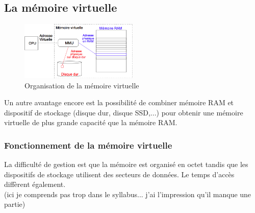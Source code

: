 \subsection{La mémoire virtuelle}
\begin{figure}
  \vspace{-0.5cm}
  \includegraphics[width=0.5\textwidth]{memvirt}
  \caption{\label{fig:memvirt}Organisation de la mémoire virtuelle}
\end{figure}
Un autre avantage encore est la possibilité de combiner mémoire RAM et dispositif de stockage (disque dur, disque SSD,...) pour obtenir une mémoire virtuelle de plus grande capacité que la mémoire RAM.

\subsubsection{Fonctionnement de la mémoire virtuelle}
La difficulté de gestion est que la mémoire est organisé en octet tandis que les dispositifs de stockage utilisent des secteurs de données. Le temps d'accès diffèrent également.\\

(ici je comprends pas trop dans le syllabus... j'ai l'impression qu'il manque une partie)\\

